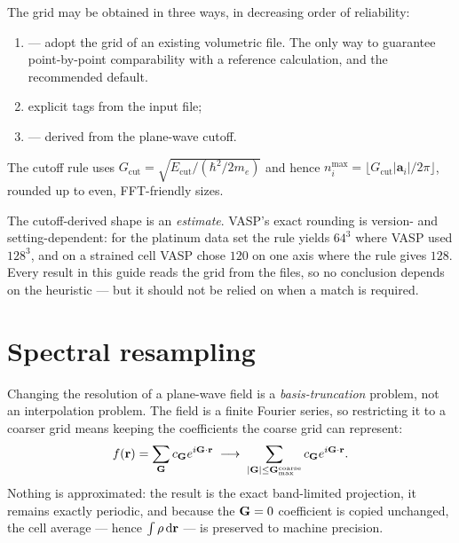 The grid may be obtained in three ways, in decreasing order of reliability:

\begin{enumerate}
  \item {} --- adopt the grid of an existing
    volumetric file. The only way to guarantee point-by-point comparability
    with a reference calculation, and the recommended default.
  \item explicit  tags from the input file;
  \item {} --- derived from the plane-wave cutoff.
\end{enumerate}

The cutoff rule uses $G_{\mathrm{cut}}=\sqrt{E_{\mathrm{cut}}/(\hbar^2/2m_e)}$
and hence $n_i^{\max} = \lfloor G_{\mathrm{cut}}|\mathbf{a}_i|/2\pi \rfloor$,
rounded up to even, FFT-friendly sizes.

\begin{pwarn}
The cutoff-derived shape is an \emph{estimate}. VASP's exact rounding is
version- and setting-dependent: for the platinum data set the rule yields $64^3$
where VASP used $128^3$, and on a strained cell VASP chose $120$ on one axis
where the rule gives $128$. Every result in this guide reads the grid from the
files, so no conclusion depends on the heuristic --- but it should not be relied
on when a match is required.
\end{pwarn}

\section{Spectral resampling}
\label{sec:resample}

Changing the resolution of a plane-wave field is a \emph{basis-truncation}
problem, not an interpolation problem. The field is a finite Fourier series, so
restricting it to a coarser grid means keeping the coefficients the coarse grid
can represent:
\begin{equation}
  f(\mathbf{r}) = \sum_{\mathbf{G}} c_{\mathbf{G}} e^{i\mathbf{G}\cdot\mathbf{r}}
  \;\longrightarrow\;
  \sum_{|\mathbf{G}| \le \mathbf{G}_{\max}^{\mathrm{coarse}}} c_{\mathbf{G}} e^{i\mathbf{G}\cdot\mathbf{r}} .
\end{equation}
Nothing is approximated: the result is the exact band-limited projection, it
remains exactly periodic, and because the $\mathbf{G}=0$ coefficient is copied
unchanged, the cell average --- hence $\int\rho\,\mathrm{d}\mathbf{r}$ --- is preserved
to machine precision.

